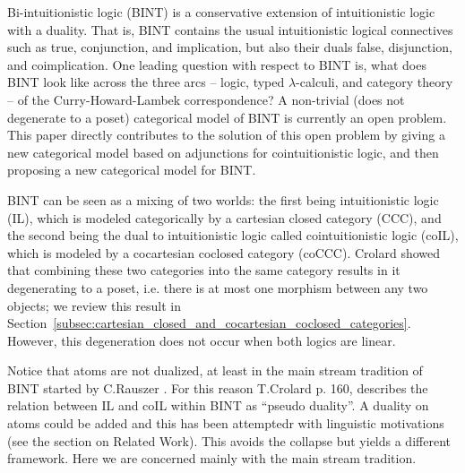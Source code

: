 Bi-intuitionistic logic (BINT) is a conservative extension of
intuitionistic logic with a duality.  That is, BINT contains the
usual intuitionistic logical connectives such as true, conjunction,
and implication, but also their duals false, disjunction, and
coimplication.  One leading question with respect to BINT is, what does
BINT look like across the three arcs -- logic, typed
$\lambda$-calculi, and category theory -- of the Curry-Howard-Lambek
correspondence?  A non-trivial (does not degenerate to a poset)
categorical model of BINT is currently an open problem.  This paper
directly contributes to the solution of this open problem by giving a
new categorical model based on adjunctions for cointuitionistic logic,
and then proposing a new categorical model for BINT.  

BINT can be seen as a mixing of two worlds: the first being
intuitionistic logic (IL), which is modeled categorically by a
cartesian closed category (CCC), and the second being the dual to
intuitionistic logic called cointuitionistic logic (coIL), which is
modeled by a cocartesian coclosed category (coCCC).  Crolard
\cite{Crolard:2001} showed that combining these two categories into
the same category results in it degenerating to a poset, i.e.
there is at most one morphism between any two objects; we review this
result in
Section~\ref{subsec:cartesian_closed_and_cocartesian_coclosed_categories}.
However, this degeneration does not occur when both logics are linear.

Notice that atoms are not dualized, at least  in the main stream tradition of BINT
started by C.Rauszer \cite{Rauszer:1974, Rauszer:1980}. For this reason
T.Crolard \cite{Crolard:2001} p. 160, describes the relation between IL and coIL
within BINT as ``pseudo duality''. A duality on atoms could be added 
and this has been attemptedr with linguistic motivations \cite{Bellin:2014} 
(see the section on Related Work).
This avoids the collapse but yields a different framework.
Here we are concerned mainly with the main stream tradition.

